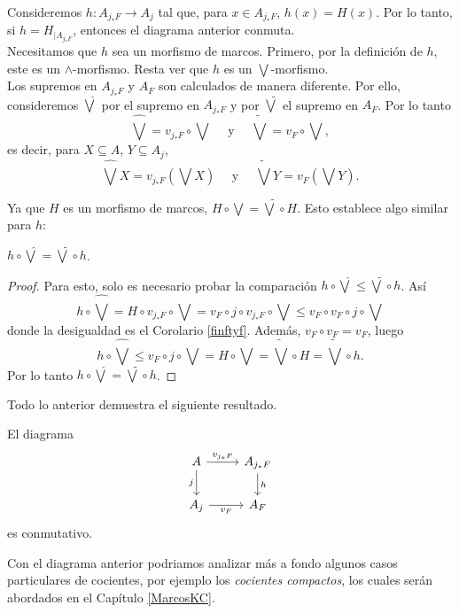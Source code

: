 Consideremos $h\colon A_{j_*F}\to A_j$ tal que, para $x\in A_{j_*F}$, $h(x)=H(x)$. Por lo tanto, si $h=H_{\mid{A_{j_*F}}}$, entonces el diagrama anterior conmuta.\\

Necesitamos que $h$ sea un morfismo de marcos. Primero, por la definición de $h$, este es un $\wedge$-morfismo. Resta ver que $h$ es un $\bigvee$-morfismo.\\

Los supremos en $A_{j_*F}$ y $A_F$ son calculados de manera diferente. Por ello, consideremos $\hat{\bigvee}$ por el supremo en $A_{j_*F}$ y por $\tilde{\bigvee}$ el supremo en $A_F$. Por lo tanto
\[
\hat{\bigvee}=v_{j_*F}\circ \bigvee\quad\mbox{ y }\quad \tilde{\bigvee}=v_{F}\circ \bigvee,
\] 
es decir, para $X\subseteq A$, $Y\subseteq A_j$,
\[
	\hat{\bigvee}X=v_{j_*F}(\bigvee X)\quad\mbox{ y }\quad \tilde{\bigvee}Y=v_{F}(\bigvee Y).
\]

Ya que $H$ es un morfismo de marcos, $H\circ \bigvee=\tilde{\bigvee}\circ H$. Esto establece algo similar para $h$:

\begin{lem}\label{bigvee g}
$h\circ \hat{\bigvee}=\tilde{\bigvee}\circ h$.
\end{lem}

\begin{proof}
Para esto, solo es necesario probar la comparación $h\circ \hat{\bigvee}\leq \tilde{\bigvee}\circ h$. Así
\[
h\circ \hat{\bigvee}=H\circ v_{j_*F}\circ \bigvee=v_F\circ j\circ v_{j_*F}\circ \bigvee\leq v_F\circ v_F\circ j\circ \bigvee
\]
donde la desigualdad es el Corolario \ref{finftyf}. Además, $v_F\circ v_F=v_F$, luego
\[
h\circ\hat{\bigvee}\leq v_F\circ j\circ \bigvee =H\circ \bigvee=\tilde{\bigvee}\circ H=\tilde{\bigvee}\circ h.
\]
Por lo tanto $h\circ\hat{\bigvee}=\tilde{\bigvee}\circ h$.
\end{proof}

Todo lo anterior demuestra el siguiente resultado.

\begin{prop}\label{VFsquare}
El diagrama
\[\begin{tikzcd}
	A & {A_{j_*F}} \\
	{A_j} & {A_F}
	\arrow["{v_{j_*F}}", from=1-1, to=1-2]
	\arrow["j"', from=1-1, to=2-1]
	\arrow["h", from=1-2, to=2-2]
	\arrow["{v_F}"', from=2-1, to=2-2]
\end{tikzcd}\]
es conmutativo.
\end{prop}

Con el diagrama anterior podriamos analizar más a fondo algunos casos particulares de cocientes, por ejemplo los \emph{cocientes compactos}, los cuales serán abordados en el Capítulo \ref{MarcosKC}.